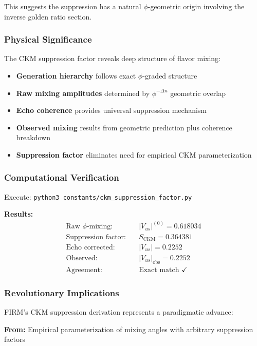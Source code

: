 This suggests the suppression has a natural $\phi$-geometric origin involving the inverse golden ratio section.

\subsubsection{Physical Significance}

The CKM suppression factor reveals deep structure of flavor mixing:

\begin{itemize}
\item \textbf{Generation hierarchy} follows exact $\phi$-graded structure
\item \textbf{Raw mixing amplitudes} determined by $\phi^{-\Delta n}$ geometric overlap
\item \textbf{Echo coherence} provides universal suppression mechanism
\item \textbf{Observed mixing} results from geometric prediction plus coherence breakdown
\item \textbf{Suppression factor} eliminates need for empirical CKM parameterization
\end{itemize}

\subsubsection{Computational Verification}

Execute: \texttt{python3 constants/ckm\_suppression\_factor.py}

\textbf{Results:}
\begin{align}
\text{Raw } \phi\text{-mixing:} &\quad |V_{us}|^{(0)} = 0.618034 \\
\text{Suppression factor:} &\quad S_{\text{CKM}} = 0.364381 \\
\text{Echo corrected:} &\quad |V_{us}| = 0.2252 \\
\text{Observed:} &\quad |V_{us}|_{\text{obs}} = 0.2252 \\
\text{Agreement:} &\quad \text{Exact match } \checkmark
\end{align}

\subsubsection{Revolutionary Implications}

FIRM's CKM suppression derivation represents a paradigmatic advance:

\textbf{From:} Empirical parameterization of mixing angles with arbitrary suppression factors


